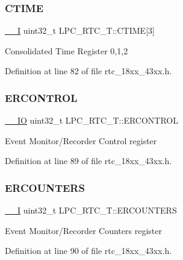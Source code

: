 \subsubsection{\texorpdfstring{C\+T\+I\+ME}{CTIME}}
{\footnotesize\ttfamily \hyperlink{core__sc300_8h_af63697ed9952cc71e1225efe205f6cd3}{\+\_\+\+\_\+I} uint32\+\_\+t L\+P\+C\+\_\+\+R\+T\+C\+\_\+\+T\+::\+C\+T\+I\+ME\mbox{[}3\mbox{]}}

Consolidated Time Register 0,1,2 

Definition at line 82 of file rtc\+\_\+18xx\+\_\+43xx.\+h.

\mbox{\label{struct_l_p_c___r_t_c___t_adcd0073be8f4dfd72986026aeb1ec3ac}} 
\subsubsection{\texorpdfstring{E\+R\+C\+O\+N\+T\+R\+OL}{ERCONTROL}}
{\footnotesize\ttfamily \hyperlink{core__sc300_8h_aec43007d9998a0a0e01faede4133d6be}{\+\_\+\+\_\+\+IO} uint32\+\_\+t L\+P\+C\+\_\+\+R\+T\+C\+\_\+\+T\+::\+E\+R\+C\+O\+N\+T\+R\+OL}

Event Monitor/\+Recorder Control register 

Definition at line 89 of file rtc\+\_\+18xx\+\_\+43xx.\+h.

\mbox{\label{struct_l_p_c___r_t_c___t_ad4bf87046bc0acbf75ace4470d9d6381}} 
\subsubsection{\texorpdfstring{E\+R\+C\+O\+U\+N\+T\+E\+RS}{ERCOUNTERS}}
{\footnotesize\ttfamily \hyperlink{core__sc300_8h_af63697ed9952cc71e1225efe205f6cd3}{\+\_\+\+\_\+I} uint32\+\_\+t L\+P\+C\+\_\+\+R\+T\+C\+\_\+\+T\+::\+E\+R\+C\+O\+U\+N\+T\+E\+RS}

Event Monitor/\+Recorder Counters register 

Definition at line 90 of file rtc\+\_\+18xx\+\_\+43xx.\+h.


